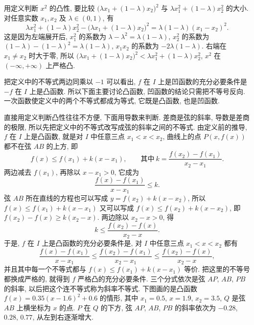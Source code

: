 \documentclass[UTF8,openany]{ctexbook}
\theoremstyle{chinesetextbook}
\begin{document}
用定义判断 $x^2$ 的凸性, 要比较 $\bigl(\lambda x_1+(1-\lambda)x_2\bigr)^2$ 与 $\lambda x_1^2+(1-\lambda)x_2^2$ 的大小. 对任意实数 $x_1,x_2$ 及 $\lambda\in(0,1)$, 有
\[
\lambda x_1^2+(1-\lambda)x_2^2-\bigl(\lambda x_1+(1-\lambda)x_2\bigr)^2=\lambda(1-\lambda)(x_1-x_2)^2.
\]
这是因为左端展开后, $x_1^2$ 的系数为 $\lambda-\lambda^2=\lambda(1-\lambda)$, $x_2^2$ 的系数为 $(1-\lambda)-(1-\lambda)^2=\lambda(1-\lambda)$, $x_1x_2$ 的系数为 $-2\lambda(1-\lambda)$. 右端在 $x_1\ne x_2$ 时大于零, 所以 $\bigl(\lambda x_1+(1-\lambda)x_2\bigr)^2<\lambda x_1^2+(1-\lambda)x_2^2$, $x^2$ 在 $(-\infty,+\infty)$ 上严格凸.

把定义中的不等式两边同乘以 $-1$ 可以看出, $f$ 在 $I$ 上是凹函数的充分必要条件是 $-f$ 在 $I$ 上是凸函数. 所以下面主要讨论凸函数, 凹函数的结论只需把不等号反向. 一次函数使定义中的两个不等式都成为等式, 它既是凸函数, 也是凹函数.

直接用定义判断凸性往往不方便, 下面用导数来判断. 差商是弦的斜率, 导数是差商的极限, 所以先把定义中的不等式改写成弦的斜率之间的不等式. 由定义前的推导, $f$ 在 $I$ 上是凸函数, 就是对 $I$ 中任意三点 $x_1<x<x_2$, 曲线上的点 $P(x,f(x))$ 都不在弦 $AB$ 的上方, 即
\[
f(x)\le f(x_1)+k(x-x_1),\qquad\text{其中}\ k=\frac{f(x_2)-f(x_1)}{x_2-x_1}.
\]
两边减去 $f(x_1)$, 再除以 $x-x_1>0$, 它成为
\[
\frac{f(x)-f(x_1)}{x-x_1}\le k.
\]
弦 $AB$ 所在直线的方程也可以写成 $y=f(x_2)+k(x-x_2)$, 所以 $f(x)\le f(x_1)+k(x-x_1)$ 又可以写成 $f(x)\le f(x_2)+k(x-x_2)$, 即 $f(x_2)-f(x)\ge k(x_2-x)$. 两边除以 $x_2-x>0$, 得
\[
k\le\frac{f(x_2)-f(x)}{x_2-x}.
\]
于是, $f$ 在 $I$ 上是凸函数的充分必要条件是, 对 $I$ 中任意三点 $x_1<x<x_2$ 都有
\[
\frac{f(x)-f(x_1)}{x-x_1}\le\frac{f(x_2)-f(x_1)}{x_2-x_1}\le\frac{f(x_2)-f(x)}{x_2-x},
\]
并且其中每一个不等式都与 $f(x)\le f(x_1)+k(x-x_1)$ 等价. 把这里的不等号都换成严格的, 就得到 $f$ 严格凸的充分必要条件. 三个分式依次是弦 $AP$, $AB$, $PB$ 的斜率, 以后把这个连不等式称为斜率不等式. 下图画的是凸函数 $f(x)=0.35(x-1.6)^2+0.6$ 的情形, 其中 $x_1=0.5$, $x=1.9$, $x_2=3.5$, $Q$ 是弦 $AB$ 上横坐标为 $x$ 的点. $P$ 在 $Q$ 的下方, 弦 $AP$, $AB$, $PB$ 的斜率依次为 $-0.28$, $0.28$, $0.77$, 从左到右逐渐增大.
\begin{center}
\end{center}
\end{document}
